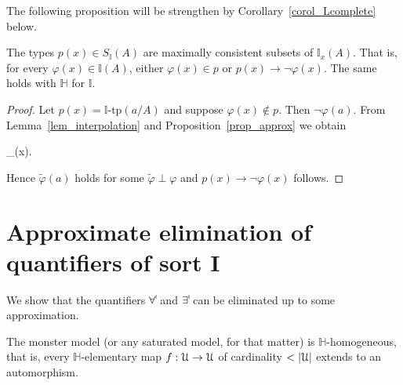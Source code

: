 \documentclass[10pt,oneside]{amsproc}
\renewcommand*{\emph}[1]{%
   \smash{\tikz[baseline]\node[rectangle, fill=teal!25, rounded corners, inner xsep=0.5ex, inner ysep=0.2ex, anchor=base, minimum height = 2.7ex]{#1};}}
\begin{document}
 The following proposition will be strengthen by Corollary~\ref{corol_Lcomplete} below.

 \begin{proposition}\label{prop_Hcomplete2}
   The types $p(x)\in S_\mathds{I}(A)$ are maximally consistent subsets of $\mathds{I}_x(A)$.
   That is, for every $\varphi(x)\in\mathds{I}(A)$, either $\varphi(x)\in p$ or $p(x)\rightarrow\neg\varphi(x)$.
   The same holds with $\mathds{H}$ for $\mathds{I}$.
 \end{proposition}

 \begin{proof}
  Let $p(x)=\mathds{I}\mbox{-tp}(a/A)$ and suppose $\varphi(x)\notin p$.
  Then $\neg\varphi(a)$.
  From Lemma~\ref{lem_interpolation} and Proposition~\ref{prop_approx} we obtain

  {\rightarrow}
  {\bigvee_{\tilde{\varphi}\perp\varphi}\tilde{\varphi}(x).}

  Hence $\tilde{\varphi}(a)$ holds for some $\tilde{\varphi}\perp\varphi$ and $p(x)\rightarrow\neg\varphi(x)$ follows.
 \end{proof}








\section{Approximate elimination of quantifiers of sort \textsf{I}}

We show that the quantifiers $\forallI $ and $\existsI $ can be eliminated up to some approximation.

\begin{proposition}
  The monster model (or any saturated model, for that matter) is $\mathds{H}$-homogeneous, that is, every $\mathds{H}$-elementary map $f:{\EuScript U}\to{\EuScript U}$ of cardinality $<|{\EuScript  U}|$ extends to an automorphism.
\end{proposition}
\end{document}
